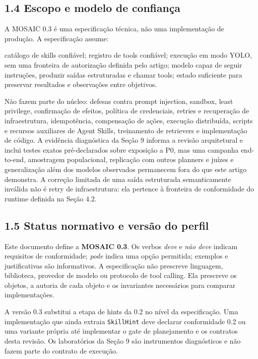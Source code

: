 \documentclass[12pt,a4paper]{article}
\begin{document}


\subsection*{1.4 Escopo e modelo de confiança}

A MOSAIC 0.3 é uma especificação técnica, não uma implementação de produção. A especificação assume:


\noindent \textbullet{} catálogo de skills confiável; \textbullet{} registro de tools confiável; \textbullet{} execução em modo YOLO, sem uma fronteira de autorização definida pelo artigo; \textbullet{} modelo capaz de seguir instruções, produzir saídas estruturadas e chamar tools; \textbullet{} estado suficiente para preservar resultados e observações entre objetivos.\par

Não fazem parte do núcleo: defesas contra prompt injection, sandbox, least privilege, confirmação de efeitos, política de credenciais, retries e recuperação de infraestrutura, idempotência, compensação de ações, execução distribuída, scripts e recursos auxiliares de Agent Skills, treinamento de retrievers e implementação de código. A evidência diagnóstica da Seção 9 informa a revisão arquitetural e inclui testes exatos pré-declarados sobre exposição a P0, mas uma campanha end-to-end, amostragem populacional, replicação com outros planners e juízes e generalização além dos modelos observados permanecem fora do que este artigo demonstra. A correção limitada de uma saída estruturada semanticamente inválida não é retry de infraestrutura: ela pertence à fronteira de conformidade do runtime definida na Seção 4.2.


\subsection*{1.5 Status normativo e versão do perfil}

Este documento define a \textbf{MOSAIC 0.3}. Os verbos \textit{deve} e \textit{não deve} indicam requisitos de conformidade; \textit{pode} indica uma opção permitida; exemplos e justificativas são informativos. A especificação não prescreve linguagem, biblioteca, provedor de modelo ou protocolo de tool calling. Ela prescreve os objetos, a autoria de cada objeto e os invariantes necessários para comparar implementações.

A versão 0.3 substitui a etapa de hints da 0.2 no nível da especificação. Uma implementação que ainda extraia \texttt{SkillHint} deve declarar conformidade 0.2 ou uma variante própria até implementar o gate de planejamento e os contratos desta revisão. Os laboratórios da Seção 9 são instrumentos diagnósticos e não fazem parte do contrato de execução.
\end{document}
